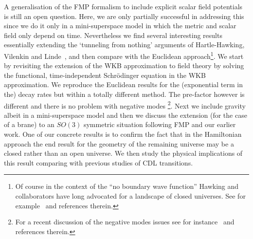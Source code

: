 \documentclass[a4paper,11pt]{article}
\numberwithin{equation}{section}
\begin{document}
A generalisation of the FMP formalism to include explicit scalar field potentials is still an open question. Here, we are only partially successful in addressing this since we do it only in a mini-superspace model in which the metric and scalar field only depend on time. Nevertheless we find several interesting results essentially extending the `tunneling from nothing' arguments of Hartle-Hawking, Vilenkin and Linde~\cite{Vilenkin:1982de, Hartle:1983ai, Vilenkin:1984wp,Linde:1983mx}, and then compare with the Euclidean approach\footnote{Of course in the context of the  ``no boundary wave function'' Hawking and collaborators have long advocated for a landscape of closed universes. See for example~\cite{Hartle:2013oda} and references therein.}. We start by revisiting the extension of the WKB approximation to field theory by solving the functional, time-independent Schr\"odinger equation in the WKB approximation. We reproduce the Euclidean results for the (exponential term in the) decay rates but within a totally different method. The pre-factor however is different and there is no problem with negative modes \footnote{For a recent discussion of the negative modes issues see for instance~\cite{Jinno:2020zzs} and references therein.}. Next we include gravity albeit in a mini-superspace model and then we discuss the extension (for the case of a brane) to an $SO(3)$ symmetric situation following FMP and our earlier work. One of our concrete results is to confirm the fact that in the Hamiltonian approach the end result for the geometry of the remaining universe may be a closed rather than an open universe. We then study the physical implications of this result comparing with previous studies of CDL transitions.
\end{document}
